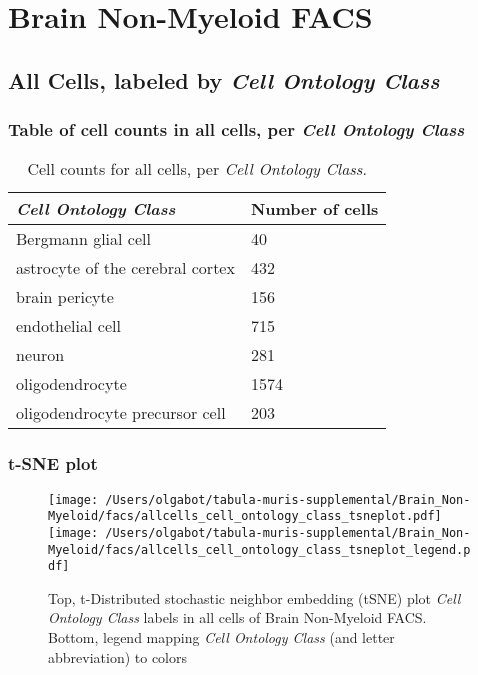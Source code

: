 \clearpage
\section{Brain Non-Myeloid FACS}

\subsection{All Cells, labeled by \emph{Cell Ontology Class}}
\subsubsection{Table of cell counts in all cells, per \emph{Cell Ontology Class}}\begin{table}[h]
\centering
\label{my-label}
\begin{tabular}{@{}ll@{}}
\toprule

\emph{Cell Ontology Class}& Number of cells \\ \midrule
Bergmann glial cell & 40 \\

astrocyte of the cerebral cortex & 432 \\

brain pericyte & 156 \\

endothelial cell & 715 \\

neuron & 281 \\

oligodendrocyte & 1574 \\

oligodendrocyte precursor cell & 203 \\
\bottomrule
\end{tabular}
\caption{Cell counts for all cells, per \emph{Cell Ontology Class}.}
\end{table}

\clearpage
\subsubsection{t-SNE plot}
\begin{figure}[h]
\centering
\texttt{[image: /Users/olgabot/tabula-muris-supplemental/Brain\_Non-Myeloid/facs/allcells\_cell\_ontology\_class\_tsneplot.pdf]}
\texttt{[image: /Users/olgabot/tabula-muris-supplemental/Brain\_Non-Myeloid/facs/allcells\_cell\_ontology\_class\_tsneplot\_legend.pdf]}
\caption{Top, t-Distributed stochastic neighbor embedding (tSNE) plot  \emph{Cell Ontology Class} labels in all cells of Brain Non-Myeloid FACS. Bottom, legend mapping \emph{Cell Ontology Class} (and letter abbreviation) to colors}
\end{figure}


